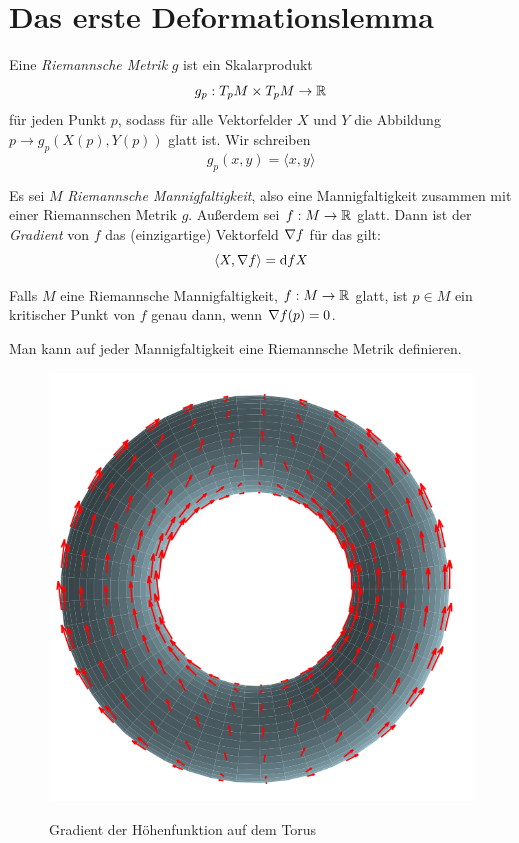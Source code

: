 \section{Das erste Deformationslemma}

\begin{definition}
    Eine \textit{Riemannsche Metrik} $g$ ist ein Skalarprodukt 
    \[ g_p:T_pM \times T_pM \to { \mathbb R } \]
    für jeden Punkt $p$, sodass für alle Vektorfelder $X$ und $Y$ die Abbildung 
    $p \to g_p(X(p), Y(p))$ glatt ist.
    Wir schreiben 
    \[ g_p(x, y) = \langle x, y \rangle \]
\end{definition}

\begin{definition}[Gradient]
    Es sei $M$ \textit{Riemannsche Mannigfaltigkeit}, also eine Mannigfaltigkeit
    zusammen mit einer Riemannschen Metrik $g$. Außerdem sei $f: M \to { \mathbb R }$ glatt.
    Dann ist der \textit{Gradient} von $f$ das (einzigartige) 
    Vektorfeld ${ \nabla } f$ für das gilt:
    \[ \langle X, { \nabla } f \rangle = { \operatorname{d} } fX \]
\end{definition}

Falls $M$ eine Riemannsche Mannigfaltigkeit, $f: M \to { \mathbb R }$ glatt, ist $p \in M$ 
ein kritischer Punkt von $f$ genau dann, wenn ${ \nabla } f (p) = 0$. 

Man kann auf jeder Mannigfaltigkeit eine Riemannsche Metrik definieren.

\begin{figure}[H]
    \centering
    \includegraphics[width=0.7\linewidth]{resources/Me-Diagram4-gradient-of-hightmapping.png}
    \label{fig:me-diagram4}
    \caption{Gradient der Höhenfunktion auf dem Torus}
\end{figure}

